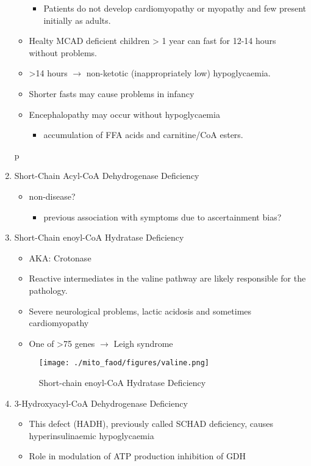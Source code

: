 \documentclass{scrartcl}
\begin{document}
\begin{enumerate}
\begin{itemize}
\begin{itemize}
\item Patients do not develop cardiomyopathy or myopathy and few present
initially as adults.
\end{itemize}
\item Healty MCAD deficient children > 1 year can fast for 12-14 hours without problems.
\item >14 hours \(\to\) non-ketotic (inappropriately low) hypoglycaemia.
\item Shorter fasts may cause problems in infancy
\item Encephalopathy may occur without hypoglycaemia
\begin{itemize}
\item accumulation of FFA acids and carnitine/CoA esters.
\end{itemize}
\end{itemize}
p
\item Short-Chain Acyl-CoA Dehydrogenase Deficiency
\label{sec:orgf194538}
\begin{itemize}
\item non-disease?
\begin{itemize}
\item previous association with symptoms due to ascertainment bias?
\end{itemize}
\end{itemize}

\item Short-Chain enoyl-CoA Hydratase Deficiency
\label{sec:org38b17a9}
\begin{itemize}
\item AKA: Crotonase
\item Reactive intermediates in the valine pathway are likely responsible
for the pathology.
\item Severe neurological problems, lactic acidosis and sometimes
cardiomyopathy
\item One of >75 genes \(\to\) Leigh syndrome
\end{itemize}

\begin{figure}[htbp]
\centering
\texttt{[image: ./mito\_faod/figures/valine.png]}
\caption{\label{fig:orgfa0a907}
Short-chain enoyl-CoA Hydratase Deficiency}
\end{figure}

\item 3-Hydroxyacyl-CoA Dehydrogenase Deficiency
\label{sec:org464e1ad}
\begin{itemize}
\item This defect (HADH), previously called SCHAD deficiency, causes
hyperinsulinaemic hypoglycaemia
\item Role in modulation of ATP production inhibition of GDH
\end{itemize}


\end{enumerate}
\end{document}
